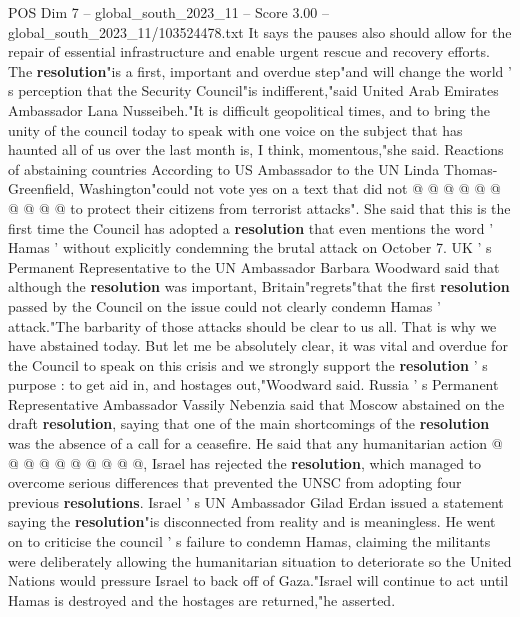 \begin{textsample}{POS Dim 7 – global\_south\_2023\_11 – Score 3.00 – global\_south\_2023\_11/103524478.txt}
It says the pauses also should allow for the repair of essential infrastructure and enable urgent rescue and recovery efforts.
The \textbf{resolution}"is a first, important and overdue step"and will change the world ' s perception that the Security Council"is indifferent,"said United Arab Emirates Ambassador Lana Nusseibeh."It is difficult geopolitical times, and to bring the unity of the council today to speak with one voice on the subject that has haunted all of us over the last month is, I think, momentous,"she said.
Reactions of abstaining countries According to US Ambassador to the UN Linda Thomas-Greenfield, Washington"could not vote yes on a text that did not @ @ @ @ @ @ @ @ @ @ to protect their citizens from terrorist attacks".
She said that this is the first time the Council has adopted a \textbf{resolution} that even mentions the word ' Hamas ' without explicitly condemning the brutal attack on October 7.
UK ' s Permanent Representative to the UN Ambassador Barbara Woodward said that although the \textbf{resolution} was important, Britain"regrets"that the first \textbf{resolution} passed by the Council on the issue could not clearly condemn Hamas ' attack."The barbarity of those attacks should be clear to us all.
That is why we have abstained today.
But let me be absolutely clear, it was vital and overdue for the Council to speak on this crisis and we strongly support the \textbf{resolution} ' s purpose : to get aid in, and hostages out,"Woodward said.
Russia ' s Permanent Representative Ambassador Vassily Nebenzia said that Moscow abstained on the draft \textbf{resolution}, saying that one of the main shortcomings of the \textbf{resolution} was the absence of a call for a ceasefire.
He said that any humanitarian action @ @ @ @ @ @ @ @ @ @, Israel has rejected the \textbf{resolution}, which managed to overcome serious differences that prevented the UNSC from adopting four previous \textbf{resolutions}.
Israel ' s UN Ambassador Gilad Erdan issued a statement saying the \textbf{resolution}"is disconnected from reality and is meaningless.
He went on to criticise the council ' s failure to condemn Hamas, claiming the militants were deliberately allowing the humanitarian situation to deteriorate so the United Nations would pressure Israel to back off of Gaza."Israel will continue to act until Hamas is destroyed and the hostages are returned,"he asserted.

\end{textsample}
